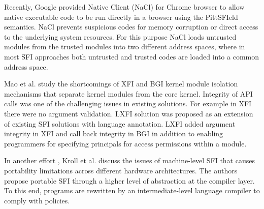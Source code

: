 Recently, Google provided Native Client (NaCl) \cite{NaCl-09} for Chrome browser to allow native executable code to be run directly in a browser using the PittSFIeld semantics. NaCl prevents suspicious codes for memory corruption or direct access to the underlying system resources. For this purpose NaCl loads untrusted modules from the trusted modules into two different address spaces, where in most SFI approaches both untrusted and trusted codes are loaded into a common address space. 

Mao et al. \cite{LXFI} study the shortcomings of XFI \cite{XFI} and BGI \cite{Castro-BGI} kernel module isolation mechanisms that separate kernel modules from the core kernel. Integrity of API calls was one of the challenging issues in existing solutions. For example in XFI there were no argument validation. LXFI solution was proposed as an extension of existing SFI solutions with language annotation. LXFI added argument integrity in XFI and call back integrity in BGI in addition to enabling programmers for specifying principals for access permissions within a module.

In another effort \cite{PSFI}, Kroll et al. discuss the issues of machine-level SFI that causes portability limitations across different hardware architectures. The authors propose portable SFI through a higher level of abstraction at the compiler layer. To this end, programs are rewritten by an intermediate-level language compiler to comply with policies.




